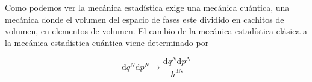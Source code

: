 \documentclass[12pt,a4paper]{article}
\numberwithin{equation}{section}
\numberwithin{figure}{section}
\newcommand{\D}{\mathrm{d}}
\theoremstyle{definition}
\begin{document}
Como podemos ver la mecánica estadística exige una mecánica cuántica, una mecánica donde el volumen del espacio de fases este dividido en cachitos de volumen, en elementos de volumen. El cambio de la mecánica estadística clásica a la mecánica estadística cuántica viene determinado por

\begin{equation}
\D q^N \D p^N  \longrightarrow \frac{\D q^N \D p^N}{h^{3N}}
\end{equation}
\end{document}
